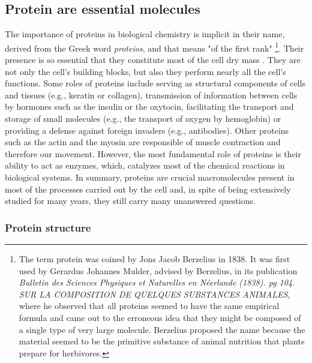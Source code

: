 \documentclass[12pt, b5paper,twoside]{tesi_upf}
\begin{document}
\subsection{Protein are essential molecules}



\par The importance of proteins in biological chemistry is implicit in their name, derived from the Greek word \textit{proteios}, and that means "of the first rank" \footnote{The term protein was coined by Jons Jacob Berzelius in 1838. It was first used by Gerardus Johannes Mulder, advised by Berzelius, in its publication  \textit{Bulletin des Sciences Physiques et Naturelles en N\'eerlande (1838). pg 104. SUR LA COMPOSITION DE QUELQUES SUBSTANCES ANIMALES}, where he observed that all proteins seemed to have the same empirical formula and came out to the erroneous idea that they might be composed of a single type of very large molecule. Berzelius proposed the name because the material seemed to be the primitive substance of animal nutrition that plants prepare for herbivores.}. Their presence is so essential that they  constitute most of the cell dry mass \cite{kessel2010}. They are not only the cell's building blocks, but also they perform nearly all the cell's functions. Some roles of proteins include serving as structural components of cells and tissues (e.g., keratin or collagen), transmission of information between cells by hormones such as the insulin or the oxytocin, facilitating the transport and storage of small molecules (e.g., the transport of oxygen by hemoglobin) or providing a defense against foreign invaders (e.g., antibodies). Other proteins such as the actin and the myosin are responsible of muscle contraction and therefore our movement. However, the most fundamental role of proteins is their ability to act as enzymes, which, catalyzes most of the chemical reactions in biological systems. In summary, proteins are crucial macromolecules present in most of the processes carried out by the cell and, in spite of being extensively studied for many years, they still carry many unanswered questions.    
  

\subsubsection{Protein structure}
\end{document}
